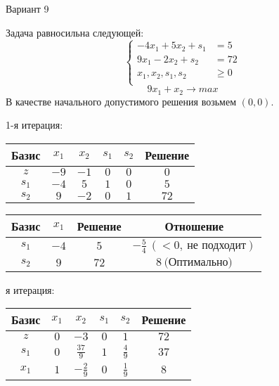 \documentclass{article}%
\begin{document}
\begin{center}%
\begin{Huge}%
Вариант 9%
\end{Huge}%
\end{center}%
Задача равносильна следующей: %
\[%
\left\{\begin{aligned}-4x_{1}+5x_{2}+s_{1} & =5 \\9x_{1}-2x_{2}+s_{2} & =72 \\x_{1},x_{2},s_{1},s_{2} & \ge 0 \\ \end{aligned}\right.%
\]%
\[%
9x_{1}+x_{2}  \to max%
\]%
В качестве начального допустимого решения возьмем %
$(0, 0).$%
\begin{flushleft}%
1{-}я итерация: %
\newline%
\newline%
\renewcommand{\arraystretch}{1.3}%
\begin{tabular}{|c|cccc|c|}%
\hline%
Базис&$x_{1}$&$x_{2}$&$s_{1}$&$s_{2}$&Решение\\%
\hline%
$z$&$-9$&$-1$&$0$&$0$&$0$\\%
\hline%
$s_{1}$&$-4$&$5$&$1$&$0$&$5$\\%
$s_{2}$&$9$&$-2$&$0$&$1$&$72$\\%
\hline%
\end{tabular}%
\newline%
\newline%
\newline%
\begin{tabular}{|cccc|}%
\hline%
Базис&$x_{1}$&Решение&Отношение\\%
\hline%
$s_{1}$&$-4$&$5$&$-\frac{5}{4}\: (< 0, \: \text{не подходит})$\\%
$s_{2}$&$9$&$72$&$8\: \text{(Оптимально)}$\\%
\hline%
\end{tabular}%
\newline%
\newline%
я итерация: %
\newline%
\newline%
\renewcommand{\arraystretch}{1.3}%
\begin{tabular}{|c|cccc|c|}%
\hline%
Базис&$x_{1}$&$x_{2}$&$s_{1}$&$s_{2}$&Решение\\%
\hline%
$z$&$0$&$-3$&$0$&$1$&$72$\\%
\hline%
$s_{1}$&$0$&$\frac{37}{9}$&$1$&$\frac{4}{9}$&$37$\\%
$x_{1}$&$1$&$-\frac{2}{9}$&$0$&$\frac{1}{9}$&$8$\\%

\end{tabular}
\end{flushleft}
\end{document}
